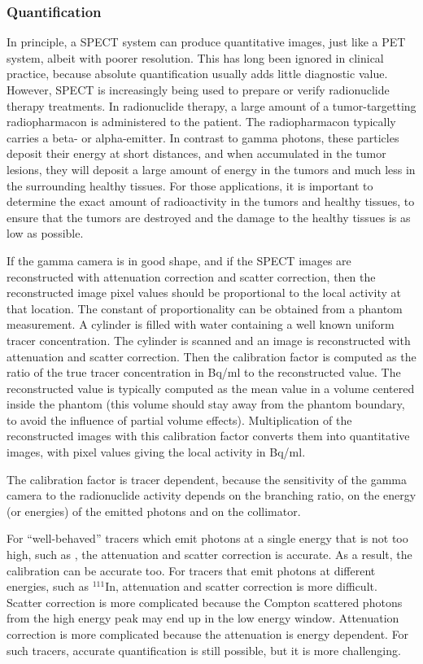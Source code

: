 \subsubsection{Quantification \label{sec:spectquant}}
In principle, a SPECT system can produce quantitative images, just
like a PET system, albeit with poorer resolution. This has long been
ignored in clinical practice, because absolute quantification usually
adds little diagnostic value. However, SPECT is increasingly being
used to prepare or verify radionuclide therapy treatments. In
radionuclide therapy, a large amount of a tumor-targetting
radiopharmacon is administered to the patient. The radiopharmacon
typically carries a beta- or alpha-emitter. In contrast to gamma
photons, these particles deposit their energy at short distances, and
when accumulated in the tumor lesions, they will deposit a large
amount of energy in the tumors and much less in the surrounding
healthy tissues. For those applications, it is important to determine
the exact amount of radioactivity in the tumors and healthy tissues,
to ensure that the tumors are destroyed and the damage to the healthy
tissues is as low as possible.

If the gamma camera is in good shape, and if the SPECT images are
reconstructed with attenuation correction and scatter correction, then
the reconstructed image pixel values should be proportional to the
local activity at that location. The constant of proportionality can
be obtained from a phantom measurement. A cylinder is filled with
water containing a well known uniform tracer concentration. The
cylinder is scanned and an image is reconstructed with attenuation and
scatter correction. Then the calibration factor is computed as the
ratio of the true tracer concentration in Bq/ml to the reconstructed
value. The reconstructed value is typically computed as the mean value
in a volume centered inside the phantom (this volume should stay away
from the phantom boundary, to avoid the influence of partial volume
effects). Multiplication of the reconstructed images with this
calibration factor converts them into quantitative images, with pixel
values giving the local activity in Bq/ml.

The calibration factor is tracer dependent, because the sensitivity of
the gamma camera to the radionuclide activity depends on the branching
ratio, on the energy (or energies) of the emitted photons and on the
collimator.

For ``well-behaved'' tracers which emit photons at a single energy
that is not too high, such as \Tc, the attenuation and scatter
correction is accurate. As a result, the calibration can be accurate
too. For tracers that emit photons at different energies, such as
$^{111}$In, attenuation and scatter correction is more
difficult. Scatter correction is more complicated because the Compton
scattered photons from the high energy peak may end up in the low
energy window. Attenuation correction is more complicated because the
attenuation is energy dependent. For such tracers, accurate
quantification is still possible, but it is more challenging.

